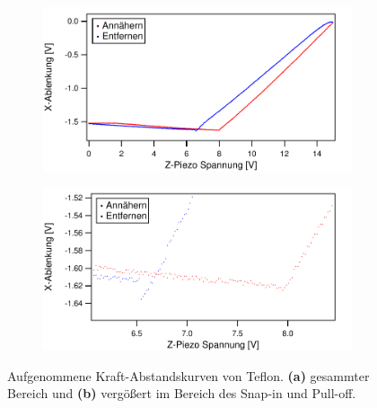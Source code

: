 \begin{figure}[H]
    \begin{subfigure}{0.8\textwidth}
        \includegraphics[width=\textwidth]{bilder/Kraft_Abstand/Teflon2.pdf}
        \caption{}
    \end{subfigure}
    \begin{subfigure}{0.8\textwidth}
        \includegraphics[width=\textwidth]{bilder/Kraft_Abstand/Teflon.pdf}
        \caption{}
    \end{subfigure}
    \caption{Aufgenommene Kraft-Abstandskurven von Teflon. \textbf{(a)} gesammter Bereich und \textbf{(b)} vergößert im Bereich des Snap-in und Pull-off.}
    \label{fig:Teflon}
\end{figure}

